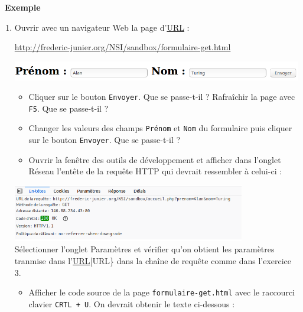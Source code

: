 \documentclass[
  11pt,
]{article}
\newcommand{\passthrough}[1]{#1}
\providecommand{\tightlist}{%
  \setlength{\itemsep}{0pt}\setlength{\parskip}{0pt}}
\newcounter{def}
\newcounter{exple}
\newenvironment{exemple}[1]
{\par \medskip   \addtocounter{exple}{1} \noindent  
\begin{bclogo}[arrondi =0.1,   noborder = true, logo=\bclampe, marge=4]{~\textbf{Exemple} \textbf{\theexple} {\itshape #1} }  \par}
{
\end{bclogo}
 \par \bigskip }
\begin{document}
\begin{exemple}{}

\begin{enumerate}
\def\labelenumi{\arabic{enumi}.}
\item
  Ouvrir avec un navigateur Web la page
  d'\href{https://developer.mozilla.org/fr/docs/Glossaire/URL}{URL} :

  \url{http://frederic-junier.org/NSI/sandbox/formulaire-get.html}

  \includegraphics{images/formulaire1.png}\\

  \begin{itemize}
  \tightlist
  \item
    Cliquer sur le bouton \passthrough{\lstinline!Envoyer!}. Que se
    passe-t-il ? Rafraîchir la page avec \passthrough{\lstinline!F5!}.
    Que se passe-t-il ?
  \item
    Changer les valeurs des champs \passthrough{\lstinline!Prénom!} et
    \passthrough{\lstinline!Nom!} du formulaire puis cliquer sur le
    bouton \passthrough{\lstinline!Envoyer!}. Que se passe-t-il ?
  \item
    Ouvrir la fenêtre des outils de développement et afficher dans
    l'onglet Réseau l'entête de la requête HTTP qui devrait ressembler à
    celui-ci :
  \end{itemize}

  \includegraphics[width=0.8\textwidth,height=\textheight]{images/entete-get.png}\\

  Sélectionner l'onglet Paramètres et vérifier qu'on obtient les
  paramètres tranmise dans
  l'\href{https://developer.mozilla.org/fr/docs/Glossaire/URL}{URL}{[}URL\}
  dans la chaîne de requête comme dans l'exercice 3.

  \begin{itemize}
  \tightlist
  \item
    Afficher le code source de la page
    \passthrough{\lstinline!formulaire-get.html!} avec le raccourci
    clavier \passthrough{\lstinline!CRTL + U!}. On devrait obtenir le
    texte ci-dessous :
  \end{itemize}


\end{enumerate}
\end{exemple}
\end{document}
